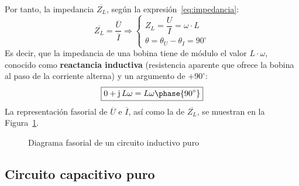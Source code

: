 Por tanto, la impedancia $\overline{Z_L}$, según la
expresión~\eqref{eq:impedancia}:
\begin{equation*}
  \overline{Z_L}=\dfrac{\overline{U}}{\overline{I}}\Rightarrow
  \begin{cases}
    Z_L=\dfrac{U}{I}=\omega\cdot L\\
    \theta=\theta_U-\theta_I=90^\circ
  \end{cases}
\end{equation*}
Es decir, que la impedancia de una bobina tiene de módulo el valor
$L\cdot\omega$, conocido como \textbf{reactancia inductiva}
(resistencia aparente que ofrece la bobina al paso de la corriente
alterna) y un argumento de $+90^\circ$:
\begin{equation}
  \boxed{0+\mathrm{j}\,L\omega=L\omega\phase{90^\circ}}
\end{equation}
La representación fasorial de $\overline{U}$ e $\overline{I}$, así
como la de $\overline{Z_L}$, se muestran en la
Figura~\ref{fig:fasorInductancia}.
\begin{figure}[H]
  \centering {}\hfil
  \caption{Diagrama fasorial de un circuito inductivo puro}
  \label{fig:fasorInductancia}
\end{figure}
	
\subsection{Circuito capacitivo puro}\label{sec:C-puro}
	
